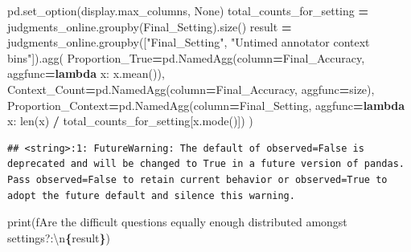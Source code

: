 \documentclass[
]{article}
\newenvironment{Shaded}{\begin{snugshade}}{\end{snugshade}}
\newcommand{\BuiltInTok}[1]{#1}
\newcommand{\CharTok}[1]{\textcolor[rgb]{0.31,0.60,0.02}{#1}}
\newcommand{\KeywordTok}[1]{\textcolor[rgb]{0.13,0.29,0.53}{\textbf{#1}}}
\newcommand{\NormalTok}[1]{#1}
\newcommand{\OperatorTok}[1]{\textcolor[rgb]{0.81,0.36,0.00}{\textbf{#1}}}
\newcommand{\SpecialCharTok}[1]{\textcolor[rgb]{0.81,0.36,0.00}{\textbf{#1}}}
\newcommand{\SpecialStringTok}[1]{\textcolor[rgb]{0.31,0.60,0.02}{#1}}
\newcommand{\StringTok}[1]{\textcolor[rgb]{0.31,0.60,0.02}{#1}}
\newcommand{\VariableTok}[1]{\textcolor[rgb]{0.00,0.00,0.00}{#1}}
\begin{document}
\begin{Shaded}
\begin{Highlighting}[]
\NormalTok{pd.set\_option(}\StringTok{\textquotesingle{}display.max\_columns\textquotesingle{}}\NormalTok{, }\VariableTok{None}\NormalTok{)}
\NormalTok{total\_counts\_for\_setting }\OperatorTok{=}\NormalTok{ judgments\_online.groupby(}\StringTok{\textquotesingle{}Final\_Setting\textquotesingle{}}\NormalTok{).size()}
\NormalTok{result }\OperatorTok{=}\NormalTok{ judgments\_online.groupby([}\StringTok{"Final\_Setting"}\NormalTok{, }\StringTok{"Untimed annotator context bins"}\NormalTok{]).agg(}
\NormalTok{    Proportion\_True}\OperatorTok{=}\NormalTok{pd.NamedAgg(column}\OperatorTok{=}\StringTok{\textquotesingle{}Final\_Accuracy\textquotesingle{}}\NormalTok{, aggfunc}\OperatorTok{=}\KeywordTok{lambda}\NormalTok{ x: x.mean()),}
\NormalTok{    Context\_Count}\OperatorTok{=}\NormalTok{pd.NamedAgg(column}\OperatorTok{=}\StringTok{\textquotesingle{}Final\_Accuracy\textquotesingle{}}\NormalTok{, aggfunc}\OperatorTok{=}\StringTok{\textquotesingle{}size\textquotesingle{}}\NormalTok{),}
\NormalTok{    Proportion\_Context}\OperatorTok{=}\NormalTok{pd.NamedAgg(column}\OperatorTok{=}\StringTok{\textquotesingle{}Final\_Setting\textquotesingle{}}\NormalTok{, aggfunc}\OperatorTok{=}\KeywordTok{lambda}\NormalTok{ x: }\BuiltInTok{len}\NormalTok{(x) }\OperatorTok{/}\NormalTok{ total\_counts\_for\_setting[x.mode()])}
\NormalTok{)}
\end{Highlighting}
\end{Shaded}

\begin{verbatim}
## <string>:1: FutureWarning: The default of observed=False is deprecated and will be changed to True in a future version of pandas. Pass observed=False to retain current behavior or observed=True to adopt the future default and silence this warning.
\end{verbatim}

\begin{Shaded}
\begin{Highlighting}[]
\BuiltInTok{print}\NormalTok{(}\SpecialStringTok{f\textquotesingle{}Are the difficult questions equally enough distributed amongst settings?:}\CharTok{\textbackslash{}n}\SpecialCharTok{\{}\NormalTok{result}\SpecialCharTok{\}}\SpecialStringTok{\textquotesingle{}}\NormalTok{)}
\end{Highlighting}
\end{Shaded}
\end{document}

